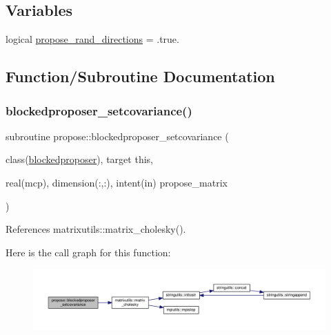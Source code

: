 \subsection*{Variables}
\begin{DoxyCompactItemize}
\item 
logical \mbox{\hyperlink{namespacepropose_a8617eeb66f67fd9a772122b9d90f4a03}{propose\+\_\+rand\+\_\+directions}} = .true.
\end{DoxyCompactItemize}


\subsection{Function/\+Subroutine Documentation}
\mbox{\label{namespacepropose_ad24a067fcde7527fedd0ecb5f3fac8c5}} 
\subsubsection{\texorpdfstring{blockedproposer\+\_\+setcovariance()}{blockedproposer\_setcovariance()}}
{\footnotesize\ttfamily subroutine propose\+::blockedproposer\+\_\+setcovariance (\begin{DoxyParamCaption}\item[{class(\mbox{\hyperlink{structpropose_1_1blockedproposer}{blockedproposer}}), target}]{this,  }\item[{real(mcp), dimension(\+:,\+:), intent(in)}]{propose\+\_\+matrix }\end{DoxyParamCaption})}



References matrixutils\+::matrix\+\_\+cholesky().

Here is the call graph for this function\+:
\nopagebreak
\begin{figure}[H]
\begin{center}
\leavevmode
\includegraphics[width=350pt]{namespacepropose_ad24a067fcde7527fedd0ecb5f3fac8c5_cgraph}
\end{center}
\end{figure}
\mbox{\label{namespacepropose_ad8938d5b08fd1352284320a465fa0dd1}} 
